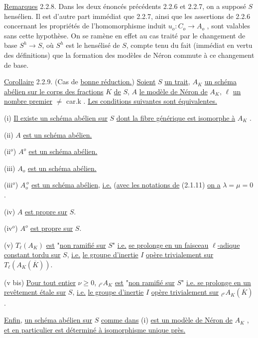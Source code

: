 \underline{Remarques} 2.2.8. Dans les deux énoncés précédents 2.2.6 et 2.2.7, on a supposé $S$ hensélien. Il est d'autre part immédiat que 2.2.7, ainsi que les assertions de 2.2.6 concernant les propriétés de l'homomorphisme induit $u_{o} : C_{o} \longrightarrow A_{o}$ , sont valables sans cette hypothèse. On se ramène en effet au cas traité par le changement de base $S^{h} \longrightarrow S$, où $S^{h}$ est le hensélisé de $S$, compte tenu du fait (immédiat en vertu des définitions) que la formation des modèles de Néron commute à ce changement de base.



\underline{Corollaire} 2.2.9. (Cas de \underline{bonne réduction.}) \underline{Soient} $S$ \underline{un trait}, $A_K$ \underline{un schéma abélien sur le corps des fractions} $K$ \underline{de} $S$, $A$ \underline{le modèle de Néron de} $A_K$, $\ell$ \underline{un nombre premier} $\neq$ car.k . \underline{Les conditions suivantes sont équivalentes.}

(i) \underline{Il existe un schéma abélien sur} $S$ \underline{dont la fibre générique est isomorphe à} $A_K$ .

(ii) $A$ \underline{est un schéma abélien.}

(ii$^o$) $A^o$ \underline{est un schéma abélien.}

(iii) $A_o$ \underline{est un schéma abélien.}

(iii$^o$) $A_o^{\,o}$ \underline{est un schéma abélien}, \underline{i.e.} (\underline{avec les notations de} (2.1.11) \underline{on a} $\lambda = \mu = 0$ .

(iv) $A$ \underline{est propre sur} $S$.

(iv$^o$) $A^o$ \underline{est propre sur} $S$.

(v) $T_\ell(A_K)$ \underline{est} "\underline{non ramifié sur} $S$" \underline{i.e.} \underline{se prolonge en un faisceau} $\ell$\underline{-adique constant tordu sur} $S$, \underline{i.e.} \underline{le groupe d'inertie} $I$ \underline{opère trivialement sur} $T_\ell(A_K(\overline{K}))$.

(v bis) \underline{Pour tout entier} $\nu \geq 0$, ${}_{\ell^\nu}A_K$ \underline{est} "\underline{non ramifié sur} $S$" \underline{i.e. se prolonge en un revêtement étale sur} $S$, \underline{i.e.} \underline{le groupe d'inertie} $I$ \underline{opère trivialement sur} ${}_{\ell^\nu}A_K(\overline{K})$.

\underline{Enfin}, \underline{un schéma abélien sur} $S$ \underline{comme dans} (i) \underline{est un modèle de Néron de} $A_K$ , \underline{et en particulier est déterminé à isomorphisme unique près.}

